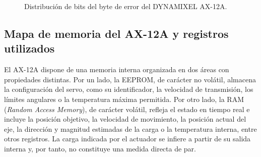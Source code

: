 \begin{figure}[H]
    \centering
    \captionsetup{justification=centering}

    \caption{Distribución de bits del byte de error del DYNAMIXEL AX-12A.}
    \label{fig:ax12_errors}
\end{figure}

\vspace{-1.5\baselineskip}
\subsection{Mapa de memoria del AX-12A y registros utilizados}

El AX-12A dispone de una memoria interna organizada en dos áreas con propiedades
distintas. Por un lado, la EEPROM, de carácter no volátil, almacena la
configuración del servo, como su identificador, la velocidad de transmisión, los límites
angulares o la temperatura máxima permitida. Por otro lado, la RAM (\textit{Random Access Memory}), de carácter volátil, refleja el estado en
tiempo real e incluye la posición objetivo, la velocidad de movimiento, la
posición actual del eje, la dirección y magnitud estimadas de la carga o la
temperatura interna, entre otros registros. La carga indicada por el actuador se
infiere a partir de su salida interna y, por tanto, no constituye una medida
directa de par.

